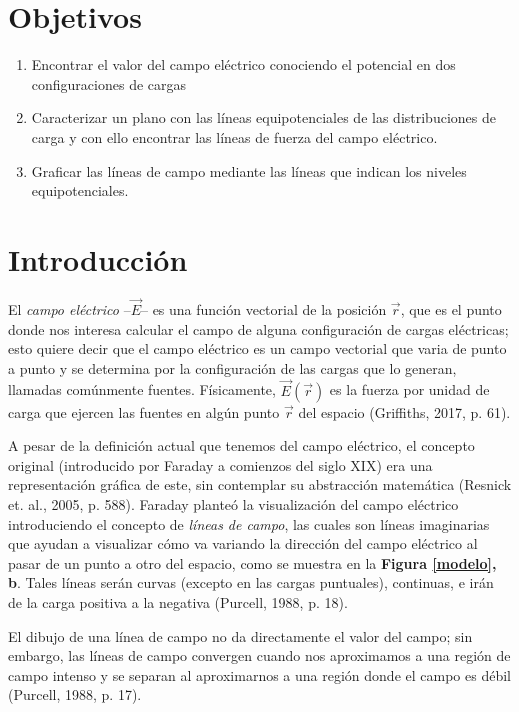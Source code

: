 \documentclass[letterpaper, 11 pt]{article}
\begin{document}
\begin{multicols}{2}

\section{Objetivos}
\begin{enumerate}
    \item Encontrar el valor del campo eléctrico conociendo el potencial en dos configuraciones de cargas
    \item Caracterizar un plano con las líneas equipotenciales de las distribuciones de carga y con ello encontrar las líneas de fuerza del campo eléctrico.
    \item Graficar las líneas de campo mediante las líneas que indican los niveles equipotenciales.
\end{enumerate}

\section{Introducción}
El \textit{campo eléctrico} --$\vec{E}$-- es una función vectorial de la posición $\vec{r}$, que es el punto donde nos interesa calcular el campo de alguna configuración de cargas eléctricas; esto quiere decir que el campo eléctrico es un campo vectorial que varia de punto a punto y se determina por la configuración de las cargas que lo generan, llamadas comúnmente fuentes. Físicamente, $\vec{ E}(\vec{r})$ es la fuerza por unidad de carga que ejercen las fuentes en algún punto $\vec{r}$ del espacio (Griffiths, 2017, p. 61).

A pesar de la definición actual que tenemos del campo eléctrico, el concepto original (introducido por Faraday a comienzos del siglo XIX) era una representación gráfica de este, sin contemplar su abstracción matemática (Resnick et. al., 2005, p. 588). Faraday planteó la visualización del campo eléctrico introduciendo el concepto de \textit{líneas de campo}, las cuales son líneas imaginarias que ayudan a visualizar cómo va variando la dirección del campo eléctrico al pasar de un punto a otro del espacio, como se muestra en la \textbf{Figura \ref{modelo}, b}. Tales líneas serán curvas (excepto en las cargas puntuales), continuas, e irán de la carga positiva a la negativa (Purcell, 1988, p. 18). 

El dibujo de una línea de campo no da directamente el valor del campo; sin embargo, las líneas de campo convergen cuando nos aproximamos a una región de campo intenso y se separan al aproximarnos a una región donde el campo es débil (Purcell, 1988, p. 17).


\end{multicols}
\end{document}
